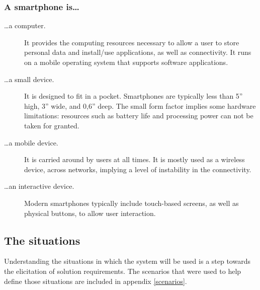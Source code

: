 \subsubsection{A smartphone is\ldots}

\begin{description}

\item[\ldots a computer.] 
It provides the computing resources necessary to allow a user to store personal data and install/use applications, as well as connectivity.
It runs on a mobile operating system that supports software applications.

\item[\ldots a small device.] 
It is designed to fit in a pocket.
Smartphones are typically less than 5'' high, 3'' wide, and 0,6'' deep.
The small form factor implies some hardware limitations: resources such as battery life and processing power can not be taken for granted.

\item[\ldots a mobile device.]
It is carried around by users at all times.
It is mostly used as a wireless device, across networks, implying a level of instability in the connectivity.

\item[\ldots an interactive device.]
Modern smartphones typically include touch-based screens, as well as physical buttons, to allow user interaction.

\end{description}

\subsection{The situations}
\label{sec:scenarios}

Understanding the situations in which the system will be used is a step towards the elicitation of solution requirements.
The scenarios that were used to help define those situations are included in appendix \ref{scenarios}.

